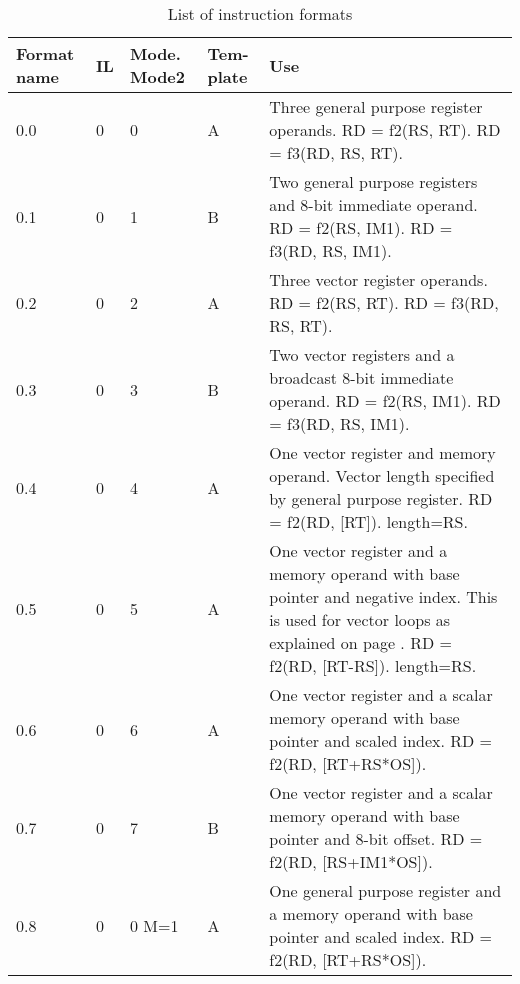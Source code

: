 \documentclass[forwardcom.tex]{subfiles}
\begin{document}
\begin{longtable} {|p{10mm}|p{6mm}|p{9mm}|p{7mm}|p{80mm}|}
\caption{List of instruction formats} \label{table:instructionFormats} \\
\endfirsthead
\endhead
\hline
Format name & IL & Mode. \small Mode2 & Tem-plate & Use \\
\hline
0.0 & 0 & 0 & A & Three general purpose register operands.\newline 
RD = f2(RS, RT). RD = f3(RD, RS, RT).\\

\hline
0.1 & 0 & 1 & B & Two general purpose registers and 8-bit immediate operand. \newline
RD = f2(RS, IM1). RD = f3(RD, RS, IM1).\\

\hline
0.2 & 0 & 2 & A & Three vector register operands.\newline 
RD = f2(RS, RT). RD = f3(RD, RS, RT).\\

\hline
0.3 & 0 & 3 & B & Two vector registers and a broadcast 8-bit immediate operand. \newline
RD = f2(RS, IM1). RD = f3(RD, RS, IM1).\\

\hline
0.4 & 0 & 4 & A & One vector register and memory operand. Vector length specified by general purpose register. \newline
RD = f2(RD, [RT]). length=RS.\\

\hline
0.5 & 0 & 5 & A & One vector register and a memory operand with base pointer and negative index.  This is used for vector loops as explained on page \pageref{vectorLoops}. \newline
RD = f2(RD, [RT-RS]). length=RS.\\

\hline
0.6 & 0 & 6 & A & One vector register and a scalar memory operand with base pointer and scaled index. \newline
RD = f2(RD, [RT+RS*OS]).\\

\hline
0.7 & 0 & 7 & B & One vector register and a scalar memory operand with base pointer and 8-bit offset. \newline
RD = f2(RD, [RS+IM1*OS]).\\

\hline
0.8 & 0 & 0 M=1 & A & One general purpose register and a memory operand with base pointer and scaled index. \newline
RD = f2(RD, [RT+RS*OS]).\\


\end{longtable}
\end{document}
